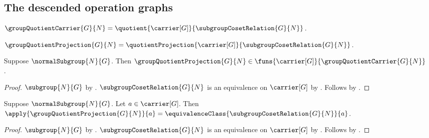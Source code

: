 \subsection{The descended operation graphs}

\begin{definition}\label{group_quotient_carrier}
    $\groupQuotientCarrier{G}{N}=
        \quotient{\carrier[G]}{\subgroupCosetRelation{G}{N}}$.
\end{definition}

\begin{definition}\label{group_quotient_projection}
    $\groupQuotientProjection{G}{N}=
        \quotientProjection{\carrier[G]}{\subgroupCosetRelation{G}{N}}$.
\end{definition}

\begin{proposition}\label{group_quotient_projection_type}
    Suppose $\normalSubgroup{N}{G}$.
    Then $\groupQuotientProjection{G}{N}\in
        \funs{\carrier[G]}{\groupQuotientCarrier{G}{N}}$.
\end{proposition}
\begin{proof}
    $\subgroup{N}{G}$ by .
    $\subgroupCosetRelation{G}{N}$ is an equivalence on
        $\carrier[G]$ by .
    Follows by
        .
\end{proof}

\begin{proposition}\label{group_quotient_projection_apply}
    Suppose $\normalSubgroup{N}{G}$.
    Let $a\in\carrier[G]$.
    Then
        $\apply{\groupQuotientProjection{G}{N}}{a}=
            \equivalenceClass{\subgroupCosetRelation{G}{N}}{a}$.
\end{proposition}
\begin{proof}
    $\subgroup{N}{G}$ by .
    $\subgroupCosetRelation{G}{N}$ is an equivalence on
        $\carrier[G]$ by .
    Follows by
        .
\end{proof}

